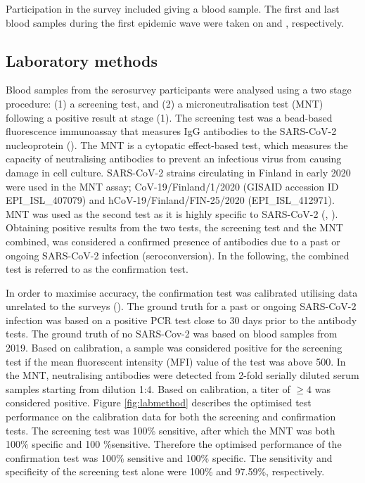 \documentclass[aoas]{imsart}
\begin{document}
Participation in the survey included giving a blood sample. The first and last blood samples during the first epidemic wave were taken on  and , respectively.

\subsection{Laboratory methods}

Blood samples from the serosurvey participants were analysed using a two stage procedure: (1) a screening test, and (2) a microneutralisation test (MNT) following a positive result at stage (1). The screening test was a bead-based fluorescence immunoassay that measures IgG antibodies to the SARS-CoV-2 nucleoprotein (\cite{Ekstrom2021}). The MNT is a cytopatic effect-based test, which measures the capacity of neutralising antibodies to prevent an infectious virus from causing damage in cell culture. SARS-CoV-2 strains circulating in Finland in early 2020 were used in the MNT assay; CoV-19/Finland/1/2020 (GISAID accession ID EPI\_ISL\_407079) and hCoV-19/Finland/FIN-25/2020 (EPI\_ISL\_412971). MNT was used as the second test as it is highly specific to SARS-CoV-2  (\cite{haveri2020},  \cite{Ekstrom2021}). Obtaining positive results from the two tests, the screening test and the MNT combined, was considered a confirmed presence of antibodies due to a past or ongoing SARS-CoV-2 infection (seroconversion). In the following, the combined test is referred to as the confirmation test.

In order to maximise accuracy, the confirmation test was calibrated utilising data unrelated to the surveys (\cite{Ekstrom2021}). The ground truth for a past or ongoing SARS-CoV-2 infection was based on a positive PCR test close to 30 days prior to the antibody tests. The ground truth of no SARS-Cov-2 was based on blood samples from 2019. Based on calibration, a sample was considered positive for the screening test if the mean fluorescent intensity (MFI) value of the test was above 500. In the MNT, neutralising antibodies were detected from 2-fold serially diluted serum samples starting from dilution 1:4. Based on calibration, a titer of $\geq 4$ was considered positive. Figure \ref{fig:labmethod} describes the optimised test performance on the calibration data for both the screening and confirmation tests. The screening test was 100\% sensitive, after which the MNT was both 100\% specific and 100 \%sensitive. Therefore the optimised performance of the confirmation test was 100\% sensitive and 100\% specific. The sensitivity and specificity of the screening test alone were 100\% and 97.59\%, respectively. 
\end{document}
